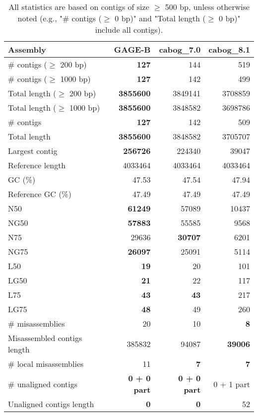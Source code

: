 \documentclass[12pt,a4paper]{article}
\begin{document}
\begin{table}[ht]
\begin{center}
\caption{All statistics are based on contigs of size $\geq$ 500 bp, unless otherwise noted (e.g., "\# contigs ($\geq$ 0 bp)" and "Total length ($\geq$ 0 bp)" include all contigs).}
\begin{tabular}{|l*{3}{|r}|}
\hline
Assembly & GAGE-B & cabog\_7.0 & cabog\_8.1 \\ \hline
\# contigs ($\geq$ 200 bp) & {\bf 127} & 144 & 519 \\ \hline
\# contigs ($\geq$ 1000 bp) & {\bf 127} & 142 & 499 \\ \hline
Total length ($\geq$ 200 bp) & {\bf 3855600} & 3849141 & 3708859 \\ \hline
Total length ($\geq$ 1000 bp) & {\bf 3855600} & 3848582 & 3698786 \\ \hline
\# contigs & {\bf 127} & 142 & 509 \\ \hline
Total length & {\bf 3855600} & 3848582 & 3705707 \\ \hline
Largest contig & {\bf 256726} & 224340 & 39047 \\ \hline
Reference length & 4033464 & 4033464 & 4033464 \\ \hline
GC (\%) & 47.53 & 47.54 & 47.94 \\ \hline
Reference GC (\%) & 47.49 & 47.49 & 47.49 \\ \hline
N50 & {\bf 61249} & 57089 & 10437 \\ \hline
NG50 & {\bf 57883} & 55585 & 9568 \\ \hline
N75 & 29636 & {\bf 30707} & 6201 \\ \hline
NG75 & {\bf 26097} & 25091 & 5114 \\ \hline
L50 & {\bf 19} & 20 & 101 \\ \hline
LG50 & {\bf 21} & 22 & 117 \\ \hline
L75 & {\bf 43} & {\bf 43} & 217 \\ \hline
LG75 & {\bf 48} & 49 & 260 \\ \hline
\# misassemblies & 20 & 10 & {\bf 8} \\ \hline
Misassembled contigs length & 385832 & 94087 & {\bf 39006} \\ \hline
\# local misassemblies & 11 & {\bf 7} & {\bf 7} \\ \hline
\# unaligned contigs & {\bf 0 + 0 part} & {\bf 0 + 0 part} & 0 + 1 part \\ \hline
Unaligned contigs length & {\bf 0} & {\bf 0} & 52 \\ \hline

\end{tabular}
\end{center}
\end{table}
\end{document}
